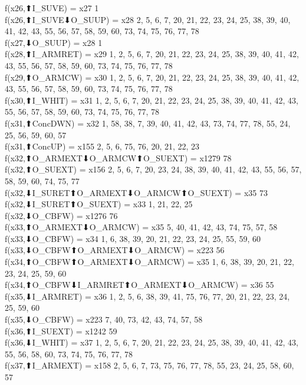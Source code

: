 f(x26,⬆I_SUVE) = x27 {1} \\
f(x26,⬆I_SUVE⬇O_SUUP) = x28 {2, 5, 6, 7, 20, 21, 22, 23, 24, 25, 38, 39, 40, 41, 42, 43, 55, 56, 57, 58, 59, 60, 73, 74, 75, 76, 77, 78} \\
f(x27,⬇O_SUUP) = x28 {1} \\
f(x28,⬆I_ARMRET) = x29 {1, 2, 5, 6, 7, 20, 21, 22, 23, 24, 25, 38, 39, 40, 41, 42, 43, 55, 56, 57, 58, 59, 60, 73, 74, 75, 76, 77, 78} \\
f(x29,⬆O_ARMCW) = x30 {1, 2, 5, 6, 7, 20, 21, 22, 23, 24, 25, 38, 39, 40, 41, 42, 43, 55, 56, 57, 58, 59, 60, 73, 74, 75, 76, 77, 78} \\
f(x30,⬆I_WHIT) = x31 {1, 2, 5, 6, 7, 20, 21, 22, 23, 24, 25, 38, 39, 40, 41, 42, 43, 55, 56, 57, 58, 59, 60, 73, 74, 75, 76, 77, 78} \\
f(x31,⬆ConcDWN) = x32 {1, 58, 38, 7, 39, 40, 41, 42, 43, 73, 74, 77, 78, 55, 24, 25, 56, 59, 60, 57} \\
f(x31,⬆ConcUP) = x155 {2, 5, 6, 75, 76, 20, 21, 22, 23} \\
f(x32,⬆O_ARMEXT⬇O_ARMCW⬆O_SUEXT) = x1279 {78} \\
f(x32,⬆O_SUEXT) = x156 {2, 5, 6, 7, 20, 23, 24, 38, 39, 40, 41, 42, 43, 55, 56, 57, 58, 59, 60, 74, 75, 77} \\
f(x32,⬇I_SURET⬆O_ARMEXT⬇O_ARMCW⬆O_SUEXT) = x35 {73} \\
f(x32,⬇I_SURET⬆O_SUEXT) = x33 {1, 21, 22, 25} \\
f(x32,⬇O_CBFW) = x1276 {76} \\
f(x33,⬆O_ARMEXT⬇O_ARMCW) = x35 {5, 40, 41, 42, 43, 74, 75, 57, 58} \\
f(x33,⬇O_CBFW) = x34 {1, 6, 38, 39, 20, 21, 22, 23, 24, 25, 55, 59, 60} \\
f(x33,⬇O_CBFW⬆O_ARMEXT⬇O_ARMCW) = x223 {56} \\
f(x34,⬆O_CBFW⬆O_ARMEXT⬇O_ARMCW) = x35 {1, 6, 38, 39, 20, 21, 22, 23, 24, 25, 59, 60} \\
f(x34,⬆O_CBFW⬇I_ARMRET⬆O_ARMEXT⬇O_ARMCW) = x36 {55} \\
f(x35,⬇I_ARMRET) = x36 {1, 2, 5, 6, 38, 39, 41, 75, 76, 77, 20, 21, 22, 23, 24, 25, 59, 60} \\
f(x35,⬇O_CBFW) = x223 {7, 40, 73, 42, 43, 74, 57, 58} \\
f(x36,⬆I_SUEXT) = x1242 {59} \\
f(x36,⬇I_WHIT) = x37 {1, 2, 5, 6, 7, 20, 21, 22, 23, 24, 25, 38, 39, 40, 41, 42, 43, 55, 56, 58, 60, 73, 74, 75, 76, 77, 78} \\
f(x37,⬆I_ARMEXT) = x158 {2, 5, 6, 7, 73, 75, 76, 77, 78, 55, 23, 24, 25, 58, 60, 57} \\
